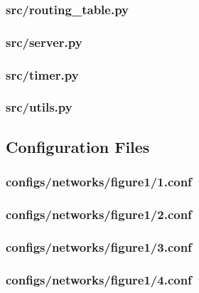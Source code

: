 \documentclass[11pt]{article} %
\begin{document}
\subsubsection{src/routing\_table.py}


\subsubsection{src/server.py}


\subsubsection{src/timer.py}


\subsubsection{src/utils.py}


\newpage
\subsection{Configuration Files}

\subsubsection{configs/networks/figure1/1.conf} \label{figure1-start}


\subsubsection{configs/networks/figure1/2.conf}


\subsubsection{configs/networks/figure1/3.conf}


\subsubsection{configs/networks/figure1/4.conf}

\end{document}
